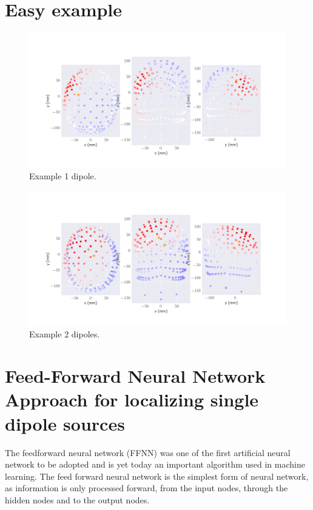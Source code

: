 \documentclass[a4paper, UKenglish, 11pt]{uiomaster}
\begin{document}
\section{Easy example}

\begin{figure}[!htb]
    \centering
    \includegraphics[width=\linewidth]{../Code/plots/finals/eeg_field_1_1.png}
    \caption{Example 1 dipole. }
    \label{fig:eeg_field_1_dipole_example}
\end{figure}

\begin{figure}[!htb]
    \centering
    \includegraphics[width=\linewidth]{../Code/plots/finals/eeg_field_2_2.png}
    \caption{Example 2 dipoles. }
    \label{fig:eeg_field_2_dipole_example}
\end{figure}

\section{Feed-Forward Neural Network Approach for localizing single dipole sources}
The feedforward neural network (FFNN) was one of the first artificial neural network to be adopted and is yet today an important algorithm used in machine learning. The feed forward neural network is the simplest form of neural network, as information is only processed forward, from the input nodes, through the hidden nodes and to the output nodes.
\end{document}
